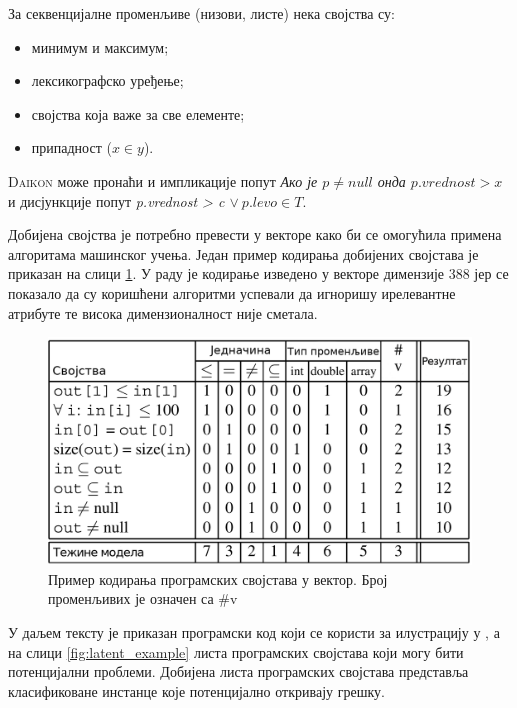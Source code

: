 \documentclass[a4paper]{article}
\begin{document}
{За секвенцијалне променљиве (низови, листе) нека својства су:
\begin{itemize}
    \item минимум и максимум;
    \item лексикографско уређење;
    \item својства која важе за све елементе;
    \item припадност ($x \in y$).
\end{itemize}

\textsc{Daikon} може пронаћи и импликације попут \textit{Ако је $p \neq null$ онда $p.vrednost > x$}
и дисјункције попут \textit{p.vrednost > c $\lor \ p.levo \in T$}.

Добијена својства је потребно превести у векторе како би се омогућила примена алгоритама машинског учења.
Један пример кодирања добијених својстава је приказан на слици \ref{fig:latent_coding}.
У раду је кодирање изведено у векторе димензије 388 јер се показало да су коришћени алгоритми
успевали да игноришу ирелевантне атрибуте те висока димензионалност није сметала.

\begin{figure}[h!]
\begin{center}
\includegraphics[scale=0.18]{./slike/latent_errors_table.png}
\end{center}
    \caption{Пример кодирања програмских својстава у вектор. Број променљивих је означен са \#v}
\label{fig:latent_coding}
\end{figure}

У даљем тексту је приказан програмски код који се користи за илустрацију у \cite{Brun04findinglatent}, а на слици \ref{fig:latent_example}
листа програмских својстава који могу бити потенцијални проблеми. Добијена листа програмских својстава
представља класификоване инстанце које потенцијално откривају грешку.

}
\end{document}
